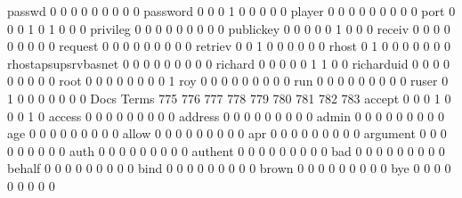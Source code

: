 \documentclass[compress,8pt]{beamer}
\begin{document}
\begin{frame}
\begin{Schunk}
  passwd                                     0   0   0   0   0   0   0   0   0
  password                                   0   0   0   1   0   0   0   0   0
  player                                     0   0   0   0   0   0   0   0   0
  port                                       0   0   0   1   0   1   0   0   0
  privileg                                   0   0   0   0   0   0   0   0   0
  publickey                                  0   0   0   0   0   1   0   0   0
  receiv                                     0   0   0   0   0   0   0   0   0
  request                                    0   0   0   0   0   0   0   0   0
  retriev                                    0   0   1   0   0   0   0   0   0
  rhost                                      0   1   0   0   0   0   0   0   0
  rhostapsupsrvbasnet                        0   0   0   0   0   0   0   0   0
  richard                                    0   0   0   0   0   1   1   0   0
  richarduid                                 0   0   0   0   0   0   0   0   0
  root                                       0   0   0   0   0   0   0   0   1
  roy                                        0   0   0   0   0   0   0   0   0
  run                                        0   0   0   0   0   0   0   0   0
  ruser                                      0   1   0   0   0   0   0   0   0
                                          Docs
Terms                                      775 776 777 778 779 780 781 782 783
  accept                                     0   0   0   1   0   0   0   1   0
  access                                     0   0   0   0   0   0   0   0   0
  address                                    0   0   0   0   0   0   0   0   0
  admin                                      0   0   0   0   0   0   0   0   0
  age                                        0   0   0   0   0   0   0   0   0
  allow                                      0   0   0   0   0   0   0   0   0
  apr                                        0   0   0   0   0   0   0   0   0
  argument                                   0   0   0   0   0   0   0   0   0
  auth                                       0   0   0   0   0   0   0   0   0
  authent                                    0   0   0   0   0   0   0   0   0
  bad                                        0   0   0   0   0   0   0   0   0
  behalf                                     0   0   0   0   0   0   0   0   0
  bind                                       0   0   0   0   0   0   0   0   0
  brown                                      0   0   0   0   0   0   0   0   0
  bye                                        0   0   0   0   0   0   0   0   0

\end{Schunk}
\end{frame}
\end{document}
